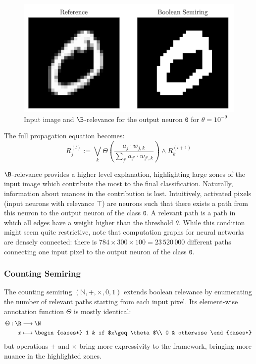 \documentclass[twocolumn]{../cs-classes/cs-classes}
\newcommand*{\1}{\digitsbb{1}}
\newcommand*{\0}{\digitsbb{0}}
\begin{document}
\begin{figure}[H]
    \centering
    \includegraphics[width=.9\linewidth]{boolean.png}
    \caption{Input image and $\B$-relevance for the output neuron \texttt{0} for $\theta=10^{-9}$}
\end{figure}

The full propagation equation becomes:
\begin{equation}
    \tag{$\B$-LRP}
    R^{(l)}_j := \bigvee_{k}\Theta\left(\frac{a_j\cdot w_{j, k}}{\sum_{j'}a_{j'}\cdot w_{j', k}}\right) \land R^{(l+1)}_k
    \label{eq:boolean-lrp}
\end{equation}

$\B$-relevance provides a higher level explanation, highlighting large zones of the input image which contribute the most to the final classification.
Naturally, information about nuances in the contribution is lost. Intuitively, activated pixels (input neurons with relevance $\top$) are neurons such that there exists a  path from this neuron to the output neuron of the class \texttt{0}. A relevant path is a path in which all edges have a weight higher than the threshold $\theta$. While this condition might seem quite restrictive, note that computation graphs for neural networks are densely connected: there is $784\times300\times100=23\,520\,000$ different paths connecting one input pixel to the output neuron of the class \texttt{0}.

\subsubsection{Counting Semiring}
The counting semiring $(\mathbb{N}, +, \times, 0, 1)$ extends boolean relevance by enumerating the number of relevant paths starting from each input pixel. Its element-wise annotation function $\Theta$ is mostly identical:
\begin{equation*}
    \begin{aligned}
        \Theta: \R&\longrightarrow\N\\
        x&\longmapsto \begin{cases*}
            1 & if $x\geq\theta$\\
            0 & otherwise
        \end{cases*}
    \end{aligned}
\end{equation*}
but operations $+$ and $\times$ bring more expressivity to the framework, bringing more nuance in the highlighted zones.
\end{document}
